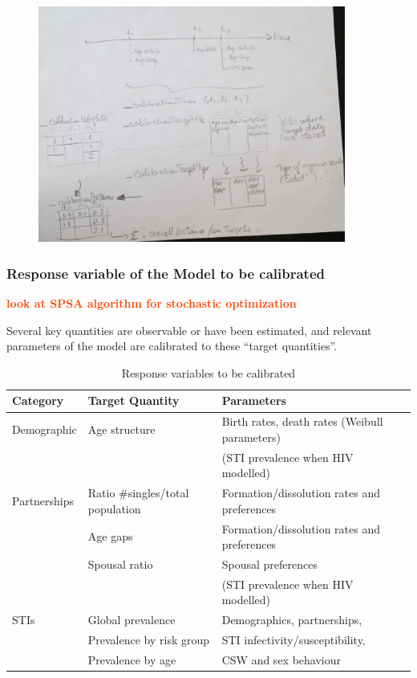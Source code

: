 \documentclass[11pt, onecolumn]{article}
\newcommand{\warning}[1]{\textbf{\textcolor{OrangeRed}{#1}}}
\begin{document}
\begin{figure}[!ht]
\centering
    \includegraphics[angle=0,width=0.9\textwidth]{calibration_schedule.jpg}
\end{figure}


\subsubsection{Response variable of the Model to be calibrated}

\warning{look at SPSA algorithm for stochastic optimization}

Several key quantities are observable or have been estimated, and relevant parameters of the model are calibrated to these ``target quantities''.
\begin{table}[htdp]
\caption{Response variables to be calibrated}
\begin{center}
\begin{tabular}{lll}

\hline
\textbf{Category} & \textbf{Target Quantity} & \textbf{Parameters} \\

\hline
Demographic  &  Age structure & Birth rates, death rates (Weibull parameters)\\
 & & (STI prevalence when HIV modelled)\\
\hline
Partnerships  &  Ratio \#singles/total population  &  Formation/dissolution rates and preferences \\
  &  Age gaps &   Formation/dissolution rates and preferences  \\
  &  Spousal ratio & Spousal preferences \\
 & & (STI prevalence when HIV modelled)\\
\hline
STIs	& Global prevalence & Demographics, partnerships,\\
	& Prevalence by risk group & STI infectivity/susceptibility,\\
	& Prevalence by age & CSW and sex behaviour\\
\hline
\end{tabular}
\end{center}
\label{default}
\end{table}
\end{document}
